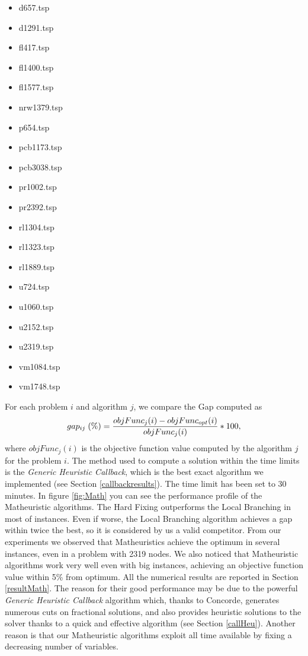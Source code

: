 \begin{multicols}{3}
    \begin{itemize}
        \item d657.tsp
        \item d1291.tsp
        \item fl417.tsp
        \item fl1400.tsp
        \item fl1577.tsp
        \item nrw1379.tsp
        \item p654.tsp
        \item pcb1173.tsp
        \item pcb3038.tsp
        \item pr1002.tsp
        \item pr2392.tsp
        \item rl1304.tsp
        \item rl1323.tsp 
        \item rl1889.tsp
        \item u724.tsp
        \item u1060.tsp
        \item u2152.tsp
        \item u2319.tsp
        \item vm1084.tsp
        \item vm1748.tsp
    \end{itemize}
    \end{multicols}
    
\noindent
For each problem $i$ and algorithm $j$, we compare the Gap computed as
\begin{equation}
	gap_{ij} \; (\%) = { objFunc_j(i) - objFunc_{opt}(i) \over objFunc_j(i) } * 100,
\end{equation}
\noindent
where $objFunc_j(i)$ is the objective function value computed by the algorithm $j$ for the problem $i$.
The method used to compute a solution within the time limits is the \textit{Generic Heuristic Callback}, which is the best exact algorithm we implemented (see Section \ref{callbackresults}). The time limit has been set to 30 minutes.
In figure \ref{fig:Math} you can see the performance profile of the Matheuristic algorithms. The Hard Fixing outperforms the Local Branching in most of instances. Even if worse, the Local Branching algorithm achieves a gap within twice the best, so it is considered by us a valid competitor. 
From our experiments we observed that Matheuristics achieve the optimum in several instances, even in a problem with 2319 nodes. We also noticed that Matheuristic algorithms work very well even with big instances, achieving an objective function value within 5\% from optimum. All the numerical results are reported in Section \ref{resultMath}.  
The reason for their good performance may be due to the powerful \textit{Generic Heuristic Callback} algorithm which, thanks to Concorde, generates numerous cuts on fractional solutions, and also provides heuristic solutions to the solver thanks to a quick and effective algorithm (see Section \ref{callHeu}). Another reason is that our Matheuristic algorithms exploit all time available by fixing a decreasing number of variables.

